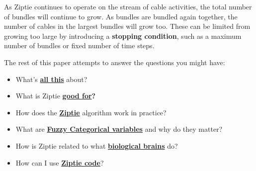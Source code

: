 As Ziptie continues to operate on the stream of cable activities,
the total number of bundles will continue to grow. As bundles are 
bundled again
together, the number of cables in the largest bundles will grow too.
These can be limited from growing too large by introducing
a \textbf{stopping condition}, such as
a maximum number of bundles or fixed number of time steps.

The rest of this paper attempts to answer the questions you might have:
\begin{itemize}

\item{What's \textbf{\hyperref[sec:background]{all this}} about?}

\item{What is Ziptie
\textbf{\hyperref[sec:applications]{good for}?}}

\item{How does the \textbf{\hyperref[sec:algorithm]{Ziptie}}
algorithm work in practice?}

\item{What are \textbf{\hyperref[sec:fuzzy]{Fuzzy Categorical variables}}
and why do they matter?}

\item{How is Ziptie related to what
\textbf{\hyperref[sec:bio]{biological brains}} do?}

\item{How can I use \textbf{\hyperref[sec:code]{Ziptie code}}?}


\end{itemize}

